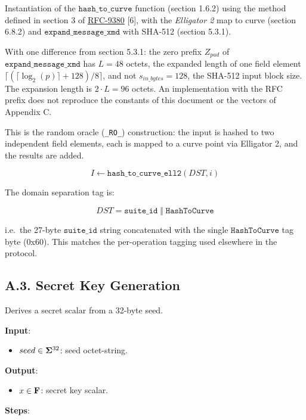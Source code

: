 \documentclass[
]{article}
\providecommand{\tightlist}{%
  \setlength{\itemsep}{0pt}\setlength{\parskip}{0pt}}
\begin{document}
Instantiation of the \(\texttt{hash\_to\_curve}\) function (section
1.6.2) using the method defined in section 3 of
\href{https://datatracker.ietf.org/doc/rfc9380}{RFC-9380} {[}6{]}, with
the \emph{Elligator 2} map to curve (section 6.8.2) and
\(\texttt{expand\_message\_xmd}\) with SHA-512 (section 5.3.1).

With one difference from section 5.3.1: the zero prefix \(Z_{pad}\) of
\(\texttt{expand\_message\_xmd}\) has \(L = 48\) octets, the expanded
length of one field element
\(\lceil(\lceil\log_2(p)\rceil + 128) / 8\rceil\), and not
\(s_{in\_bytes} = 128\), the SHA-512 input block size. The expansion
length is \(2 \cdot L = 96\) octets. An implementation with the RFC
prefix does not reproduce the constants of this document or the vectors
of Appendix C.

This is the random oracle (\texttt{\_RO\_}) construction: the input is
hashed to two independent field elements, each is mapped to a curve
point via Elligator 2, and the results are added.

\[I \gets \texttt{hash\_to\_curve\_ell2}(DST, i)\]

The domain separation tag is:

\[DST = \texttt{suite\_id} \;\Vert\; \texttt{HashToCurve}\]

i.e.~the 27-byte \(\texttt{suite\_id}\) string concatenated with the
single \(\texttt{HashToCurve}\) tag byte (0x60). This matches the
per-operation tagging used elsewhere in the protocol.

\subsection{A.3. Secret Key
Generation}\label{a.3.-secret-key-generation}

Derives a secret scalar from a 32-byte seed.

\textbf{Input}:

\begin{itemize}
\tightlist
\item
  \(seed \in \bold{\Sigma}^{32}\): seed octet-string.
\end{itemize}

\textbf{Output}:

\begin{itemize}
\tightlist
\item
  \(x \in \bold{F}\): secret key scalar.
\end{itemize}

\textbf{Steps}:
\end{document}
